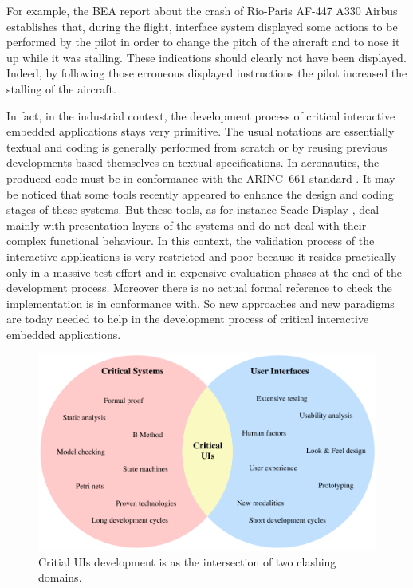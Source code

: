 \documentclass[10pt]{sigplanconf}
\begin{document}
For example, the BEA report \cite{BEA12} about the crash of Rio-Paris AF-447 
A330 Airbus establishes that,  during the flight, interface system
displayed some actions to be performed by the pilot in order to change
the pitch  of the aircraft  and to nose it  up while it  was stalling.
These indications should clearly not  have been displayed.  Indeed, by
following those  erroneous displayed instructions the  pilot increased
the stalling of the aircraft.

In  fact,  in  the  industrial context,  the  development  process  of
critical interactive  embedded applications stays very  primitive. The
usual  notations  are  essentially  textual and  coding  is  generally
performed  from  scratch or  by  reusing  previous developments  based
themselves  on textual  specifications. In  aeronautics, the  produced
code must be in  conformance with the ARINC~661 standard \cite{ARINC661}.
It may  be noticed that  some tools  recently appeared to  enhance the
design and  coding stages of these  systems.  But these tools,  as for
instance   Scade  Display \cite{scade-display},  deal   mainly   with
presentation layers of the systems and  do not deal with their complex
functional behaviour. In  this context, the validation  process of the
interactive  applications  is  very  restricted and  poor  because  it
resides practically  only in  a massive test  effort and  in expensive
evaluation phases  at the  end of  the development  process.  Moreover
there is no actual formal reference  to check the implementation is in
conformance with. So new approaches and new paradigms are today needed
to help  in the development  process of critical  interactive embedded
applications.



\begin{figure}[h]
\centering
\includegraphics[width=\linewidth,height=\linewidth,keepaspectratio]{figures/twoClashingDomains.pdf}
\caption{Critial UIs development is as the intersection of two clashing domains.} 
\label{fig:twoClashingDomains}
\end{figure}
\end{document}

